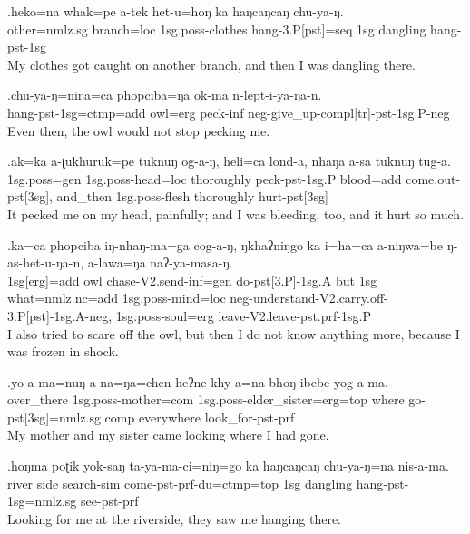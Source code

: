 \exg.heko=na         whak=pe      a-tek              het-u=hoŋ              ka  haŋcaŋcaŋ chu-ya-ŋ.\\
 other{\sc =nmlz.sg} branch{\sc =loc} {\sc 1sg.poss-}clothes hang{\sc -3.P[pst]=seq}  {\sc 1sg} dangling     hang{\sc -pst-1sg}\\
My clothes got caught on another branch, and then I was dangling there.

\exg.chu-ya-ŋ=niŋa=ca                    phopciba=ŋa   ok-ma      n-lept-i-ya-ŋa-n.\\
 hang{\sc -pst-1sg=ctmp=add} owl{\sc =erg} peck{\sc -inf} {\sc neg-}give\_up{\sc -compl[tr]-pst-1sg.P-neg}\\
Even then, the owl would not stop pecking me.

\exg.ak=ka          a-ʈukhuruk=pe            tuknuŋ    og-a-ŋ, heli=ca         lond-a, nhaŋa   a-sa             tuknuŋ    tug-a.\\
 {\sc 1sg.poss=gen} {\sc 1sg.poss-}head{\sc =loc} thoroughly peck{\sc -pst-1sg.P} blood{\sc =add} come.out{\sc -pst[3sg],} and\_then {\sc 1sg.poss-}flesh thoroughly hurt{\sc -pst[3sg]}\\
It pecked me on my head, painfully; and I was bleeding, too, and it hurt so much.


\exg.ka=ca              phopciba iŋ-nhaŋ-ma=ga             cog-a-ŋ, ŋkhaʔniŋgo ka  i=ha=ca                       a-niŋwa=be             ŋ-as-het-u-ŋa-n, a-lawa=ŋa                  naʔ-ya-masa-ŋ.\\
 {\sc 1sg[erg]=add} owl      chase{\sc -V2.send-inf=gen} do{\sc -pst[3.P]-1sg.A} but           {\sc 1sg} what{\sc =nmlz.nc=add} {\sc 1sg.poss-}mind{\sc =loc} {\sc neg-}understand{\sc -V2.carry.off-3.P[pst]-1sg.A-neg,} {\sc 1sg.poss-}soul{\sc =erg} leave{\sc -V2.leave-pst.prf-1sg.P}\\
I also tried to scare off the owl, but then I do not know anything more, because I was frozen in shock.


\exg.yo         a-ma=nuŋ      a-na=ŋa=chen      heʔne khy-a=na       bhoŋ ibebe     yog-a-ma.\\
 over\_there {\sc 1sg.poss-}mother{\sc =com}  {\sc 1sg.poss-}elder\_sister{\sc =erg=top}  where  go{\sc -pst[3sg]=nmlz.sg} comp  everywhere look\_for{\sc -pst-prf}\\
My mother and my sister came looking where I had gone.


\exg.hoŋma poʈik yok-saŋ         ta-ya-ma-ci=niŋ=go                  ka  haŋcaŋcaŋ chu-ya-ŋ=na                  nis-a-ma.\\
 river  side   search{\sc -sim} come{\sc -pst-prf-du=ctmp=top}  {\sc 1sg} dangling     hang{\sc -pst-1sg=nmlz.sg} see{\sc -pst-prf}\\
Looking for me at the riverside, they saw me hanging there.

